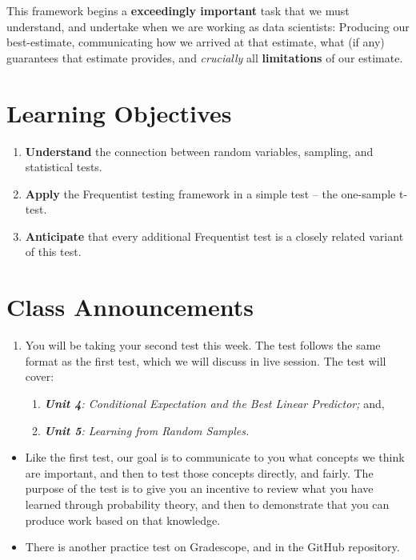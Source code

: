 \documentclass[
  letterpaper,
  DIV=11,
  numbers=noendperiod]{scrreprt}
\providecommand{\tightlist}{%
  \setlength{\itemsep}{0pt}\setlength{\parskip}{0pt}}\usepackage{longtable,booktabs,array}
\begin{document}
This framework begins a \textbf{exceedingly important} task that we must
understand, and undertake when we are working as data scientists:
Producing our best-estimate, communicating how we arrived at that
estimate, what (if any) guarantees that estimate provides, and
\emph{crucially} all \textbf{limitations} of our estimate.

\section{Learning Objectives}\label{learning-objectives-5}

\begin{enumerate}
\def\labelenumi{\arabic{enumi}.}
\tightlist
\item
  \textbf{Understand} the connection between random variables, sampling,
  and statistical tests.
\item
  \textbf{Apply} the Frequentist testing framework in a simple test --
  the one-sample t-test.
\item
  \textbf{Anticipate} that every additional Frequentist test is a
  closely related variant of this test.
\end{enumerate}

\section{Class Announcements}\label{class-announcements-4}

\begin{enumerate}
\def\labelenumi{\arabic{enumi}.}
\tightlist
\item
  You will be taking your second test this week. The test follows the
  same format as the first test, which we will discuss in live session.
  The test will cover:

  \begin{enumerate}
  \def\labelenumii{\arabic{enumii}.}
  \item
    \emph{\textbf{Unit 4}: Conditional Expectation and the Best Linear
    Predictor;} and,
  \item
    \emph{\textbf{Unit 5}: Learning from Random Samples.}
  \end{enumerate}
\end{enumerate}

\begin{itemize}
\tightlist
\item
  Like the first test, our goal is to communicate to you what concepts
  we think are important, and then to test those concepts directly, and
  fairly. The purpose of the test is to give you an incentive to review
  what you have learned through probability theory, and then to
  demonstrate that you can produce work based on that knowledge.
\item
  There is another practice test on Gradescope, and in the GitHub
  repository.
\end{itemize}
\end{document}
